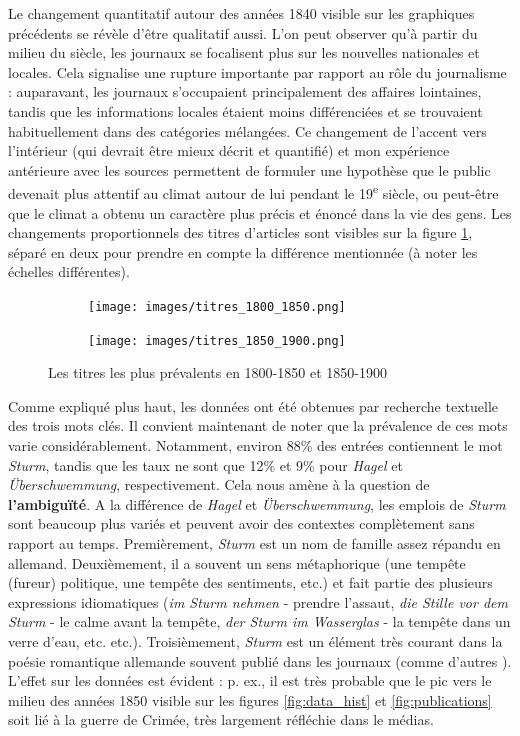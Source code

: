 \documentclass[a4paper,twoside,12pt]{article}
\begin{document}
Le changement quantitatif autour des années 1840 visible sur les graphiques précédents se révèle d'être qualitatif aussi. L'on peut observer qu'à partir du milieu du siècle, les journaux se focalisent plus sur les nouvelles nationales et locales. Cela signalise une rupture importante par rapport au rôle du journalisme : auparavant, les journaux s'occupaient principalement des affaires lointaines, tandis que les informations locales étaient moins différenciées et se trouvaient habituellement dans des catégories mélangées. Ce changement de l'accent vers l'intérieur (qui devrait être mieux décrit et quantifié) et mon expérience antérieure avec les sources permettent de formuler une hypothèse que le public devenait plus attentif au climat autour de lui pendant le 19\textsuperscript{e} siècle, ou peut-être que le climat a obtenu un caractère plus précis et énoncé dans la vie des gens. Les changements proportionnels des titres d'articles sont visibles sur la figure \ref{fig:titles_lineplots}, séparé en deux pour prendre en compte la différence mentionnée (à noter les échelles différentes). 

\begin{figure}[h]
\begin{subfigure}
    \centering
    \texttt{[image: images/titres\_1800\_1850.png]}
\end{subfigure}
\begin{subfigure}
    \centering
    \texttt{[image: images/titres\_1850\_1900.png]}
\end{subfigure}
\caption{Les titres les plus prévalents en 1800-1850 et 1850-1900}
\label{fig:titles_lineplots}
\end{figure}

Comme expliqué plus haut, les données ont été obtenues par recherche textuelle des trois mots clés. Il convient maintenant de noter que la prévalence de ces mots varie considérablement. Notamment, environ 88\% des entrées contiennent le mot \textit{Sturm}, tandis que les taux ne sont que 12\% et 9\% pour \textit{Hagel} et \textit{Überschwemmung}, respectivement. Cela nous amène à la question de \textbf{l'ambiguïté}. A la différence de \textit{Hagel} et \textit{Überschwemmung}, les emplois de \textit{Sturm} sont beaucoup plus variés et peuvent avoir des contextes complètement sans rapport au temps. Premièrement, \textit{Sturm} est un nom de famille assez répandu en allemand. Deuxièmement, il a souvent un sens métaphorique (une tempête (fureur) politique, une tempête des sentiments, etc.) et fait partie des plusieurs expressions idiomatiques (\textit{im Sturm nehmen} - prendre l'assaut, \textit{die Stille vor dem Sturm} - le calme avant la tempête, \textit{der Sturm im Wasserglas} - la tempête dans un verre d'eau, etc. etc.). Troisièmement, \textit{Sturm} est un élément très courant dans la poésie romantique allemande souvent publié dans les journaux (comme d'autres ). L'effet sur les données est évident : p. ex., il est très probable que le pic vers le milieu des années 1850 visible sur les figures \ref{fig:data_hist} et \ref{fig:publications} soit lié à la guerre de Crimée, très largement réfléchie dans le médias.
\end{document}
